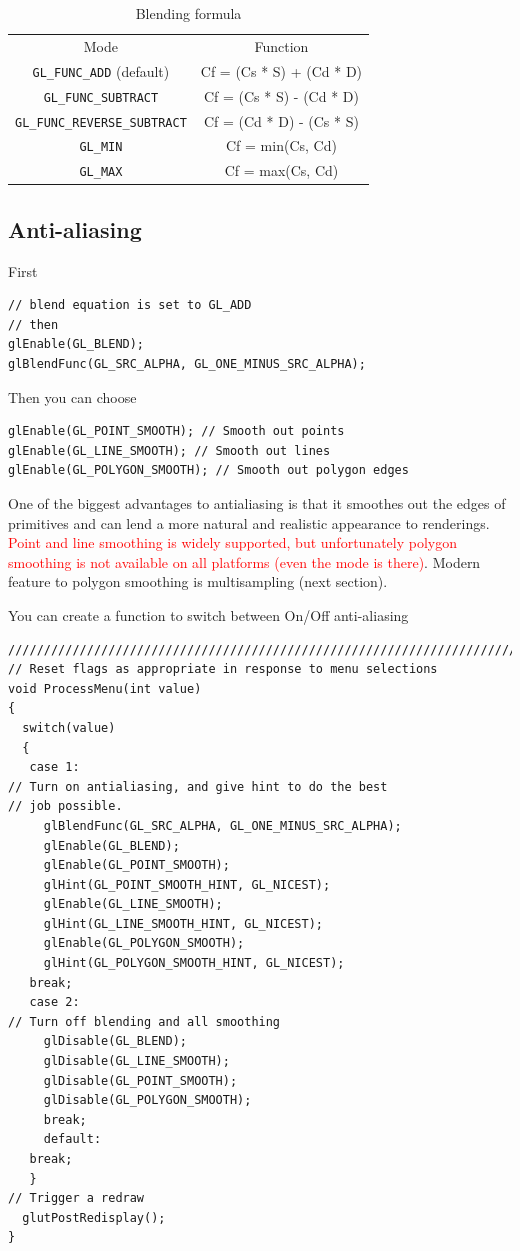 \begin{table}[hbt]
  \begin{center}
    \caption{Blending formula}
    \begin{tabular}{cc} 
      \hline
      Mode & Function \\
      \verb!GL_FUNC_ADD! (default) & Cf = (Cs * S) + (Cd * D) \\
      \verb!GL_FUNC_SUBTRACT! & Cf = (Cs * S) - (Cd * D) \\
      \verb!GL_FUNC_REVERSE_SUBTRACT! & Cf = (Cd * D) - (Cs * S) \\
      \verb!GL_MIN! & Cf = min(Cs, Cd) \\
      \verb!GL_MAX! & Cf = max(Cs, Cd) \\
      \hline\hline
    \end{tabular}
  \end{center}
  \label{tab:blending_equation}
\end{table}

\subsection{Anti-aliasing}
\label{sec:anti-aliasing}

First
\begin{verbatim}
// blend equation is set to GL_ADD
// then
glEnable(GL_BLEND);
glBlendFunc(GL_SRC_ALPHA, GL_ONE_MINUS_SRC_ALPHA);
\end{verbatim}
Then you can choose
\begin{verbatim}
glEnable(GL_POINT_SMOOTH); // Smooth out points
glEnable(GL_LINE_SMOOTH); // Smooth out lines
glEnable(GL_POLYGON_SMOOTH); // Smooth out polygon edges
\end{verbatim}
One of the biggest advantages to antialiasing is that it smoothes out
the edges of primitives and can lend a more natural and realistic
appearance to renderings. \textcolor{red}{Point and line smoothing is widely
  supported, but unfortunately polygon smoothing is not available on all
  platforms (even the mode is there)}. Modern feature to polygon
smoothing is multisampling (next section). 



You can create a function to switch between On/Off anti-aliasing
\begin{verbatim}
///////////////////////////////////////////////////////////////////////
// Reset flags as appropriate in response to menu selections
void ProcessMenu(int value)
{
  switch(value)
  {
   case 1:
// Turn on antialiasing, and give hint to do the best
// job possible.
     glBlendFunc(GL_SRC_ALPHA, GL_ONE_MINUS_SRC_ALPHA);
     glEnable(GL_BLEND);
     glEnable(GL_POINT_SMOOTH);
     glHint(GL_POINT_SMOOTH_HINT, GL_NICEST);
     glEnable(GL_LINE_SMOOTH);
     glHint(GL_LINE_SMOOTH_HINT, GL_NICEST);
     glEnable(GL_POLYGON_SMOOTH);
     glHint(GL_POLYGON_SMOOTH_HINT, GL_NICEST);
   break;
   case 2:
// Turn off blending and all smoothing
     glDisable(GL_BLEND);
     glDisable(GL_LINE_SMOOTH);
     glDisable(GL_POINT_SMOOTH);
     glDisable(GL_POLYGON_SMOOTH);
     break;
     default:
   break;
   }
// Trigger a redraw
  glutPostRedisplay();
}
\end{verbatim}

